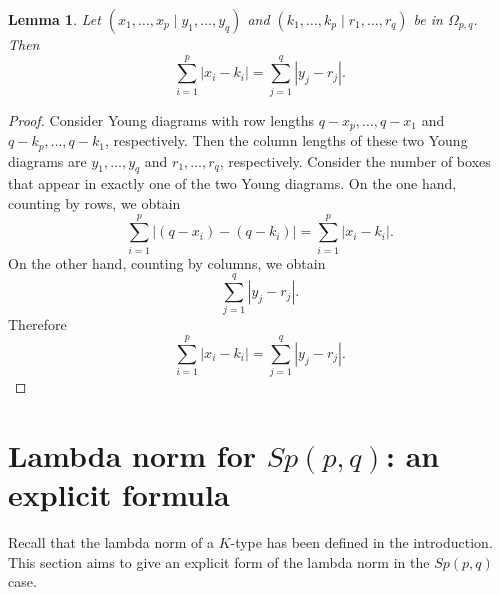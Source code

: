 \documentclass[11pt]{amsart}
\theoremstyle{plain}
\newtheorem{lemma}[thm]{Lemma}
\theoremstyle{definition}
\begin{document}
 \begin{lemma}\label{omegapq}
 	Let $(x_1, \dots, x_p \mid y_1, \dots, y_q)$ and $(k_1, \dots, k_p\mid r_1, \dots, r_q)$ be in $\Omega_{p, q}$. Then
 	\[\sum_{i=1}^p |x_i-k_i|=\sum_{j=1}^q |y_j-r_j|.\]
 \end{lemma}
 \begin{proof}
 Consider Young diagrams with row lengths $q-x_p,\dots,q-x_1$ and $q-k_p,\dots,q-k_1$, respectively. Then the column lengths of these two Young diagrams are $y_1,\dots,y_q$ and $r_1,\dots,r_q$, respectively. Consider the number of boxes that appear in exactly one of the two Young diagrams. On the one hand, counting by rows, we obtain
 		\[\sum_{i=1}^p|(q-x_i)-(q-k_i)|=\sum_{i=1}^p|x_i-k_i|.\]
 	On the other hand, counting by columns, we obtain
 		\[\sum_{j=1}^q|y_j-r_j|.\]
 	Therefore
 	\[\sum_{i=1}^p|x_i-k_i|=\sum_{j=1}^q|y_j-r_j|.\]
 \end{proof}



\section{Lambda norm for $Sp(p, q)$: an explicit formula}\label{sec-lambda-norm}
Recall that the lambda norm of a $K$-type has been defined in the introduction.
 This section aims to give an explicit form of the lambda norm in the $Sp(p, q)$ case.
\end{document}
